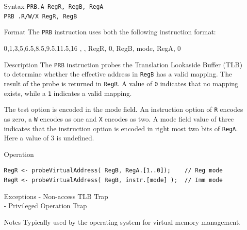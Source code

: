 %
%
\pagebreak
{}

\begin{iPageDescEntry}{Syntax}
    \texttt{PRB.A RegR, RegB, RegA} \\
    \texttt{PRB .R/W/X RegR, RegB}
\end{iPageDescEntry}

\begin{iPageDescEntry}{Format}
    The \texttt{PRB} instruction uses both the following instruction format: \\

    \begin{flushleft}
    \drawInstrFormat
        {0,1,3,5,6.5,8.5,9.5,11.5,16}
        {\OpCodeGrpSYS, \OpCodePRB, RegR, 0, RegB, mode, RegA, 0}
    \end{flushleft}
   
\end{iPageDescEntry}

\begin{iPageDescEntry}{Description}
    The \texttt{PRB} instruction probes the Translation Lookaside Buffer (TLB) 
    to determine whether the effective address in \texttt{RegB} has a valid mapping. 
    The result of the probe is returned in \texttt{RegR}. A value of \texttt{0} indicates that no mapping exists, while a \texttt{1} indicates a valid mapping.  
    
    The test option is encoded in the mode field. An instruction option of \texttt{R} encodes as zero, a \texttt{W} encodes as one and \texttt{X} encodes as two. A mode field value of three indicates that the instruction option is encoded in right most two bits of \texttt{RegA}. Here a value of 3 is undefined.
\end{iPageDescEntry}

\begin{iPageDescOpEntry}{Operation}
\begin{lstlisting}[style=iPageOpStyle]
RegR <- probeVirtualAddress( RegB, RegA.[1..0]);    // Reg mode
RegR <- probeVirtualAddress( RegB, instr.[mode] );  // Imm mode
\end{lstlisting}
\end{iPageDescOpEntry}

\begin{iPageDescEntry}{Exceptions}
    - Non-access TLB Trap \\
    - Privileged Operation Trap
\end{iPageDescEntry}

\begin{iPageDescEntry}{Notes}
    Typically used by the operating system for virtual memory management.
\end{iPageDescEntry}
